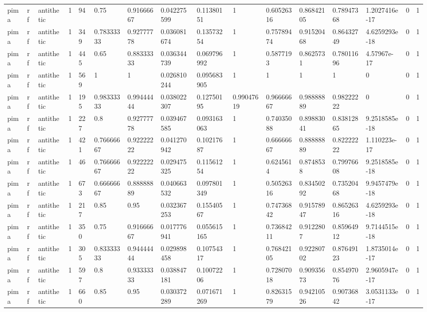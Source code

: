 \begin{tabular}{llllllllllllllll}
pima & rf & antithetic & 1 & 94 & 0.75 & 0.91666667 & 0.042275599 & 0.11380151 & 1 & 0.60526316 & 0.86842105 & 0.78947368 & 1.2027416e-17 & 0 & 1 \\
pima & rf & antithetic & 1 & 349 & 0.78333333 & 0.92777778 & 0.036081674 & 0.13573254 & 1 & 0.75789474 & 0.91520468 & 0.86432749 & 4.6259293e-18 & 0 & 1 \\
pima & rf & antithetic & 1 & 445 & 0.65 & 0.88333333 & 0.036344739 & 0.069796992 & 1 & 0.5877193 & 0.8625731 & 0.78011696 & 4.57967e-17 & 0 & 1 \\
pima & rf & antithetic & 1 & 569 & 1 & 1 & 0.026810244 & 0.095683905 & 1 & 1 & 1 & 1 & 0 & 0 & 1 \\
pima & rf & antithetic & 1 & 195 & 0.98333333 & 0.99444444 & 0.038022307 & 0.12750195 & 0.99047619 & 0.96666667 & 0.98888889 & 0.98222222 & 0 & 0 & 1 \\
pima & rf & antithetic & 1 & 227 & 0.8 & 0.92777778 & 0.039467585 & 0.093163063 & 1 & 0.74035088 & 0.89883041 & 0.83812865 & 9.2518585e-18 & 0 & 1 \\
pima & rf & antithetic & 1 & 421 & 0.76666667 & 0.92222222 & 0.041270942 & 0.10217687 & 1 & 0.66666667 & 0.88888889 & 0.82222222 & 1.110223e-17 & 0 & 1 \\
pima & rf & antithetic & 1 & 46 & 0.76666667 & 0.92222222 & 0.029475325 & 0.11561254 & 1 & 0.6245614 & 0.8748538 & 0.79976608 & 9.2518585e-18 & 0 & 1 \\
pima & rf & antithetic & 1 & 673 & 0.66666667 & 0.88888889 & 0.040663532 & 0.097801349 & 1 & 0.50526316 & 0.83450292 & 0.73520468 & 9.9457479e-18 & 0 & 1 \\
pima & rf & antithetic & 1 & 217 & 0.85 & 0.95 & 0.032367253 & 0.15540567 & 1 & 0.74736842 & 0.91578947 & 0.86526316 & 4.6259293e-18 & 0 & 1 \\
pima & rf & antithetic & 1 & 350 & 0.75 & 0.91666667 & 0.017776941 & 0.055615165 & 1 & 0.73684211 & 0.9122807 & 0.85964912 & 9.7144515e-18 & 0 & 1 \\
pima & rf & antithetic & 1 & 305 & 0.83333333 & 0.94444444 & 0.029898458 & 0.10754317 & 1 & 0.76842105 & 0.92280702 & 0.87649123 & 1.8735014e-17 & 0 & 1 \\
pima & rf & antithetic & 1 & 597 & 0.8 & 0.93333333 & 0.038847181 & 0.10072206 & 1 & 0.72807018 & 0.90935673 & 0.85497076 & 2.9605947e-17 & 0 & 1 \\
pima & rf & antithetic & 1 & 660 & 0.85 & 0.95 & 0.030372289 & 0.071671269 & 1 & 0.82631579 & 0.94210526 & 0.90736842 & 3.0531133e-17 & 0 & 1 \\

\end{tabular}
